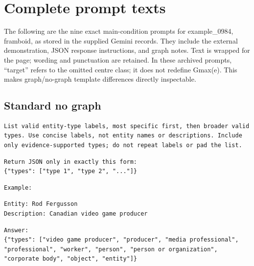 \chapter{Complete prompt texts}

The following are the nine exact main-condition prompts for example\_\allowbreak{}0984, framboid, as stored in the supplied Gemini records. They include the external demonstration, JSON response instructions, and graph notes. Text is wrapped for the page; wording and punctuation are retained. In these archived prompts, “target” refers to the omitted centre class; it does not redefine Gmax(e). This makes graph/no-graph template differences directly inspectable.


\FloatBarrier

\section{Standard no graph}

\begin{Verbatim}[fontsize=\footnotesize,breaklines=true,breakanywhere=true]
List valid entity-type labels, most specific first, then broader valid types. Use concise labels, not entity names or descriptions. Include only evidence-supported types; do not repeat labels or pad the list.
\end{Verbatim}

\begin{Verbatim}[fontsize=\footnotesize,breaklines=true,breakanywhere=true]
Return JSON only in exactly this form:
{"types": ["type 1", "type 2", "..."]}
\end{Verbatim}

\begin{Verbatim}[fontsize=\footnotesize,breaklines=true,breakanywhere=true]
Example:
\end{Verbatim}

\begin{Verbatim}[fontsize=\footnotesize,breaklines=true,breakanywhere=true]
Entity: Rod Fergusson
Description: Canadian video game producer
\end{Verbatim}

\begin{Verbatim}[fontsize=\footnotesize,breaklines=true,breakanywhere=true]
Answer:
{"types": ["video game producer", "producer", "media professional", "professional", "worker", "person", "person or organization", "corporate body", "object", "entity"]}
\end{Verbatim}

